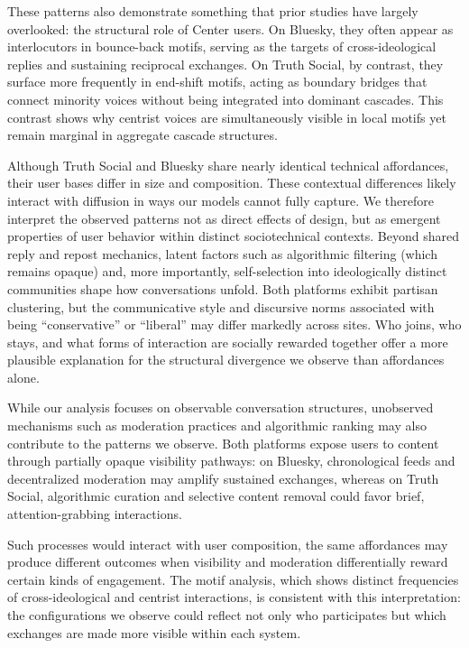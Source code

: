 \documentclass[letterpaper]{article} %
\begin{document}
These patterns also demonstrate something that prior studies have largely overlooked: the structural role of Center users. On Bluesky, they often appear as interlocutors in bounce-back motifs, serving as the targets of cross-ideological replies and sustaining reciprocal exchanges. On Truth Social, by contrast, they surface more frequently in end-shift motifs, acting as boundary bridges that connect minority voices without being integrated into dominant cascades. This contrast shows why centrist voices are simultaneously visible in local motifs yet remain marginal in aggregate cascade structures.

Although Truth Social and Bluesky share nearly identical technical affordances, their user bases differ in size and composition. These contextual differences likely interact with diffusion in ways our models cannot fully capture. We therefore interpret the observed patterns not as direct effects of design, but as emergent properties of user behavior within distinct sociotechnical contexts. Beyond shared reply and repost mechanics, latent factors such as algorithmic filtering (which remains opaque) and, more importantly, self-selection into ideologically distinct communities shape how conversations unfold. Both platforms exhibit partisan clustering, but the communicative style and discursive norms associated with being “conservative” or “liberal” may differ markedly across sites. Who joins, who stays, and what forms of interaction are socially rewarded together offer a more plausible explanation for the structural divergence we observe than affordances alone.

While our analysis focuses on observable conversation structures, unobserved mechanisms such as moderation practices and algorithmic ranking may also contribute to the patterns we observe.
Both platforms expose users to content through partially opaque visibility pathways: on Bluesky, chronological feeds and decentralized moderation may amplify sustained exchanges, whereas on Truth Social, algorithmic curation and selective content removal could favor brief, attention-grabbing interactions.

Such processes would interact with user composition, the same affordances may produce different outcomes when visibility and moderation differentially reward certain kinds of engagement.
The motif analysis, which shows distinct frequencies of cross-ideological and centrist interactions, is consistent with this interpretation: the configurations we observe could reflect not only who participates but which exchanges are made more visible within each system.
\end{document}
